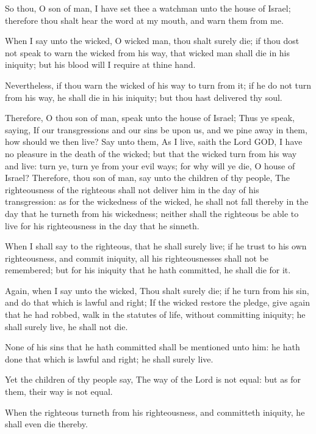 \verse So thou, O son of man, I have set thee a watchman unto the house of Israel; therefore thou shalt hear the word at my mouth, and warn them from me.

\verse When I say unto the wicked, O wicked man, thou shalt surely die; if thou dost not speak to warn the wicked from his way, that wicked man shall die in his iniquity; but his blood will I require at thine hand.

\verse Nevertheless, if thou warn the wicked of his way to turn from it; if he do not turn from his way, he shall die in his iniquity; but thou hast delivered thy soul.

\verse Therefore, O thou son of man, speak unto the house of Israel; Thus ye speak, saying, If our transgressions and our sins be upon us, and we pine away in them, how should we then live?  \verse Say unto them, As I live, saith the Lord GOD, I have no pleasure in the death of the wicked; but that the wicked turn from his way and live: turn ye, turn ye from your evil ways; for why will ye die, O house of Israel?  \verse Therefore, thou son of man, say unto the children of thy people, The righteousness of the righteous shall not deliver him in the day of his transgression: as for the wickedness of the wicked, he shall not fall thereby in the day that he turneth from his wickedness; neither shall the righteous be able to live for his righteousness in the day that he sinneth.

\verse When I shall say to the righteous, that he shall surely live; if he trust to his own righteousness, and commit iniquity, all his righteousnesses shall not be remembered; but for his iniquity that he hath committed, he shall die for it.

\verse Again, when I say unto the wicked, Thou shalt surely die; if he turn from his sin, and do that which is lawful and right; \verse If the wicked restore the pledge, give again that he had robbed, walk in the statutes of life, without committing iniquity; he shall surely live, he shall not die.

\verse None of his sins that he hath committed shall be mentioned unto him: he hath done that which is lawful and right; he shall surely live.

\verse Yet the children of thy people say, The way of the Lord is not equal: but as for them, their way is not equal.

\verse When the righteous turneth from his righteousness, and committeth iniquity, he shall even die thereby.

